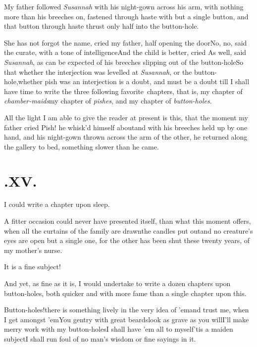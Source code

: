 \documentclass{article}
\begin{document}
My father followed \textit{Susannah} with his\break
night-gown across his arm, with nothing\break
more than his breeches on, fastened\break
through haste with but a single button,\break
and that button through haste thrust\break
only half into the button-hole.

\tsh She has not forgot the name, cried my father, half
opening the door\tsk No,
no, said the curate, with a tone of intelligence\tsk And
the child is better, cried  As well, said \textit{Susannah}, as
can be ex\-pect\-ed\tsk {} 
of his breeches slipping out of the button-hole\tsk So that whether
the interjection was levelled at \textit{Susannah}, or the
button-hole,\tsk whether pish was an interjection  is a doubt, and must be a
doubt till I shall have time to write the three following
favorite\sic\ chapters, that is, my chapter of
\textit{chamber-maids}\tsk my chapter of \textit{pishes},
and my chapter of \textit{button-holes}.

All the light I am able to give the reader at present is this,
that the moment my father cried Pish! he whisk’d himself
about\tsk and with his breeches held up by one hand, and his
night-gown thrown across the arm of the other, he returned along the
gallery to bed, something slower than he came.

\medskip
\section{.\enspace XV.}

 I could write a chapter upon\break
sleep.

A fitter occasion could never have presented itself, than what
this moment offers, when all the curtains of the family are
drawn\tsk the candles put out\tsk and no creature’s eyes
are open but a single one, for the other has been shut these twenty
years, of my mother’s nurse.

It is a fine subject!

And yet, as fine as it is, I would undertake to write a dozen chapters upon
button-holes, both quicker and with\break
more fame than a single chapter upon this.

Button-holes!\tsh there is something\break
lively in the very idea of ’em\tsk and trust\break
me, when I get amongst ’em\tsk You\break
gentry with great beards\tsh look as\break
grave as you will\tsh I’ll make merry\break
work with my button-holes\tsk I shall have
’em all to myself\tsk ’tis a maiden subject\break\tsk I shall run
foul of no man’s wisdom or fine sayings in it.
\end{document}
